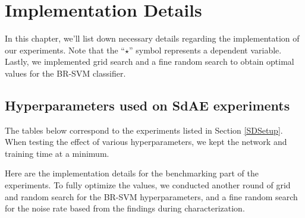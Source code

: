 %
%
%
%
%

\chapter{Implementation Details}
\label{AppendixImplementation}

\par In this chapter, we'll list down necessary details regarding the
implementation of our experiments. Note that the ``$\star$'' symbol represents
a dependent variable. Lastly, we implemented grid search and a fine random
search to obtain optimal values for the BR-SVM classifier.

\section{Hyperparameters used on SdAE experiments}
\par The tables below correspond to the experiments listed in Section
\ref{SDSetup}. When testing the effect of various hyperparameters,
we kept the network and training time at a minimum.



\par Here are the implementation details for the benchmarking part of the
experiments. To fully optimize the values, we conducted another round of grid
and random search for the BR-SVM hyperparameters, and a fine random search
for the noise rate based from the findings during characterization.

